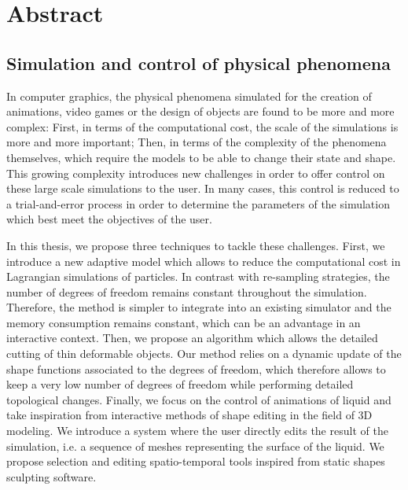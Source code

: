 \chapter*[Abstract]{Abstract}

\section*{\Large{Simulation and control of physical phenomena}}

In computer graphics, the physical phenomena simulated for the creation of animations, video games or the design of objects are found to be more and more complex:
First, in terms of the computational cost, the scale of the simulations is more and more important;
Then, in terms of the complexity of the phenomena themselves, which require the models to be able to change their state and shape.
This growing complexity introduces new challenges in order to offer control on these large scale simulations to the user.
In many cases, this control is reduced to a trial-and-error process in order to determine the parameters of the simulation which best meet the objectives of the user.

In this thesis, we propose three techniques to tackle these challenges.
First, we introduce a new adaptive model which allows to reduce the computational cost in Lagrangian simulations of particles.
In contrast with re-sampling strategies, the number of degrees of freedom remains constant throughout the simulation.
Therefore, the method is simpler to integrate into an existing simulator and the memory consumption remains constant, which can be an advantage in an interactive context.
Then, we propose an algorithm which allows the detailed cutting of thin deformable objects.
Our method relies on a dynamic update of the shape functions associated to the degrees of freedom, which therefore allows to keep a very low number of degrees of freedom while performing detailed topological changes.
Finally, we focus on the control of animations of liquid and take inspiration from interactive methods of shape editing in the field of 3D modeling.
We introduce a system where the user directly edits the result of the simulation, i.e. a sequence of meshes representing the surface of the liquid.
We propose selection and editing spatio-temporal tools inspired from static shapes sculpting software.
